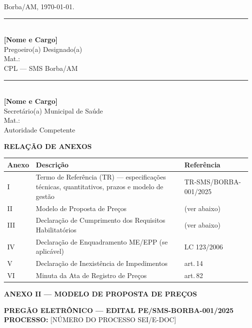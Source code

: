 \documentclass[12pt,a4paper]{article}
\newcommand{\art}[1]{art.\,#1}
\newcommand{\assinatura}[3]{%
  \begin{center}\vspace{0.2cm}
  \rule{7cm}{0.5pt}\\[3pt]
  \textbf{#1}\\\small #2\\\small Mat.: \underline{\hspace{2cm}}\\\small #3
  \end{center}}
\newcommand{\editalNum}{EDITAL PE/SMS-BORBA-001/2025}
\newcommand{\trRef}{TR-SMS/BORBA-001/2025}
\newcommand{\procNum}{[NÚMERO DO PROCESSO SEI/E-DOC]}
\begin{document}
\vspace{0.5cm}
\noindent Borba/AM, \today.

\vspace{1.2cm}
\begin{minipage}{0.47\linewidth}
\assinatura{[Nome e Cargo]}{Pregoeiro(a) Designado(a)}{CPL --- SMS Borba/AM}
\end{minipage}
\hfill
\begin{minipage}{0.47\linewidth}
\assinatura{[Nome e Cargo]}{Secretário(a) Municipal de Saúde}{Autoridade Competente}
\end{minipage}

\clearpage
\begin{center}
  \textbf{\large\color{navy}RELAÇÃO DE ANEXOS}
\end{center}

\begin{table}[H]\centering\small{}
\begin{tabular}{C{1.5cm} L{9.0cm} C{3.0cm}}
  \color{white}\textbf{Anexo} &
  \color{white}\textbf{Descrição} &
  \color{white}\textbf{Referência} \\
  \toprule
  I   & Termo de Referência (TR) --- especificações técnicas, quantitativos,
        prazos e modelo de gestão & \trRef \\
  II  & Modelo de Proposta de Preços & (ver abaixo) \\
  III & Declaração de Cumprimento dos Requisitos Habilitatórios & (ver abaixo) \\
  IV  & Declaração de Enquadramento ME/EPP (se aplicável) & LC 123/2006 \\
  V   & Declaração de Inexistência de Impedimentos & \art{14} \\
  VI  & Minuta da Ata de Registro de Preços & \art{82} \\
  \bottomrule
\end{tabular}
\end{table}

\clearpage
\begin{center}
  \textbf{\large\color{navy}ANEXO II --- MODELO DE PROPOSTA DE PREÇOS}
\end{center}

\vspace{0.5cm}
\noindent\textbf{PREGÃO ELETRÔNICO --- \editalNum}\\
\textbf{PROCESSO:} \procNum
\end{document}

